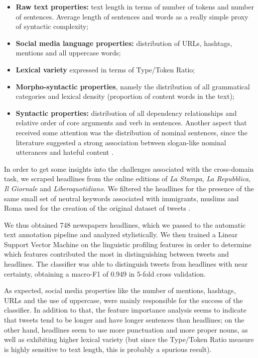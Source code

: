 \begin{itemize}
    \item{\textbf{Raw text properties:}} text length in terms of number of tokens and number of sentences. Average length of sentences and words as a really simple proxy of syntactic complexity;
    \item{\textbf{Social media language properties:}} distribution of URLs, hashtags, mentions and all uppercase words;
    \item{\textbf{Lexical variety}} expressed in terms of Type/Token Ratio;
    \item{\textbf{Morpho-syntactic properties}}, namely the distribution of all grammatical categories and lexical density (proportion of content words in the text);
    \item{\textbf{Syntactic properties:}} distribution of all dependency relationships and relative order of core arguments and verb in sentences. Another aspect that received some attention was the distribution of nominal sentences, since the literature suggested a strong association between slogan-like nominal utterances and hateful content \cite{comandini_nominal_utterances}.
\end{itemize}

In order to get some insights into the challenges associated with the cross-domain task, we scraped headlines from the online editions of \emph{La Stampa}, \emph{La Repubblica}, \emph{Il Giornale} and \emph{Liberoquotidiano}.
We filtered the headlines for the presence of the same small set of neutral keywords associated with immigrants, muslims and Roma used for the creation of the original dataset of tweets \cite{poletto_hate_2017}.

We thus obtained 748 newspapers headlines, which we passed to the automatic text annotation pipeline and analyzed stylistically.
We then trained a Linear Support Vector Machine on the linguistic profiling features in order to determine which features contributed the most in distinguishing between tweets and headlines. The classifier was able to distinguish tweets from headlines with near certainty, obtaining a macro-F1 of 0.949 in 5-fold cross validation.

As expected, social media properties like the number of mentions, hashtags, URLs and the use of uppercase, were mainly responsible for the success of the classifier. In addition to that, the feature importance analysis seems to indicate that tweets tend to be longer and have longer sentences than headlines; on the other hand, headlines seem to use more punctuation and more proper nouns, as well as exhibiting higher lexical variety (but since the Type/Token Ratio measure is highly sensitive to text length, this is probably a spurious result).

